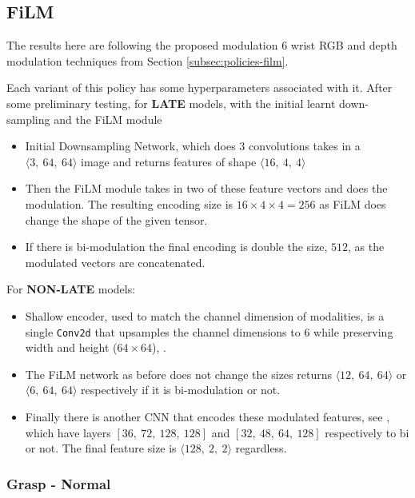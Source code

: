 \subsection{FiLM}
The results here are following the proposed modulation 6 wrist RGB and depth modulation techniques from Section \ref{subsec:policies-film}. 

Each variant of this policy has some hyperparameters associated with it. After some preliminary testing, for \textbf{LATE} models, with the initial learnt down-sampling and the FiLM module
\begin{itemize}
  \item Initial Downsampling Network, which does $3$ convolutions takes in a \(\langle 3, ~64, ~64 \rangle\) image and returns features of shape \(\langle 16, ~4, ~4 \rangle \)
  \item Then the FiLM module takes in two of these feature vectors and does the modulation. The resulting encoding size is \(16 \times 4 \times 4 = 256\) as FiLM does change the shape of the given tensor.
  \item If there is bi-modulation the final encoding is double the size, $512$, as the modulated vectors are concatenated.
\end{itemize}

For \textbf{NON-LATE} models:
\begin{itemize}
  \item Shallow encoder, used to match the channel dimension of modalities, is a single \verb|Conv2d|  that upsamples the channel dimensions to $6$ while preserving width and height ($64 \times 64$), .
  \item The FiLM network as before does not change the sizes returns \(\langle 12, ~64, ~64 \rangle \) or \(\langle 6, ~64, ~64 \rangle \) respectively if it is bi-modulation or not.
  \item Finally there is another CNN that encodes these modulated features, see , which have layers $\left[36, ~72, ~128, ~128\right]$ and $\left[32, ~48, ~64, ~128\right]$ respectively to bi or not. The final feature size is \(\langle 128, ~2, ~2 \rangle\) regardless.
\end{itemize}

\subsubsection{Grasp - Normal}

